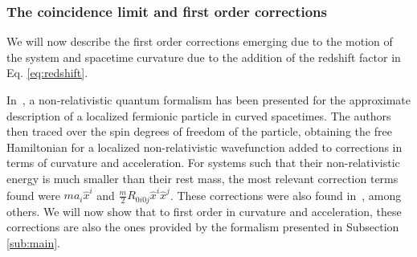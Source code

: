 \documentclass[letterpaper,12pt,titlepage,oneside,final]{book}
\begin{document}




\subsubsection*{The coincidence limit and first order corrections}\label{sub:coincidence}

We will now describe the first order corrections emerging due to the motion of the system and spacetime curvature due to the addition of the redshift factor in Eq. \eqref{eq:redshift}.

In~\cite{jonas}, a non-relativistic quantum formalism has been presented for the approximate description of a localized fermionic particle in curved spacetimes. The authors then traced over the spin degrees of freedom of the particle, obtaining the free Hamiltonian for a localized non-relativistic wavefunction added to corrections in terms of curvature and acceleration. For systems such that their non-relativistic energy is much smaller than their rest mass, the most relevant correction terms found were $ma_i \hat{x}^i$ and $\frac{m}{2}R_{0i0j}\hat{x}^i\hat{x}^j$. {These corrections were also found in~\cite{gravDetec,roura,theguy,Nico}, among others.} We will now show that to first order in curvature and acceleration, these corrections are also the ones provided by the formalism presented in Subsection \ref{sub:main}. 
\end{document}
